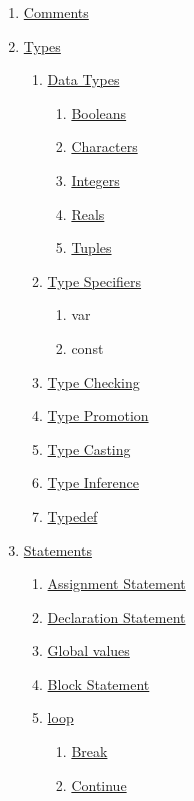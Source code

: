 \documentclass{article}
\begin{document}
	\begin{enumerate}[label*=\arabic*]
		\item \hyperref[sec:comments]{Comments}
		\item \hyperref[sec:types]{Types}
		\begin{enumerate}[label*=.\arabic*]
			\item \hyperref[sec:types]{Data Types}
			\begin{enumerate}[label*=.\arabic*]
				\item \hyperref[ssec:boolean]{Booleans}
				\item \hyperref[sec:character]{Characters}
				\item \hyperref[sec:integer]{Integers}
				\item \hyperref[sec:real]{Reals}
				\item \hyperref[sec:tuple]{Tuples}
			\end{enumerate}
			\item \hyperref[sec:typeSpecifiers]{Type Specifiers}
			\begin{enumerate}[label*=.\arabic*]
				\item var
				\item const
			\end{enumerate}
			\item \hyperref[sec:typeChecking]{Type Checking}
			\item \hyperref[sec:typePromotion]{Type Promotion}
			\item \hyperref[sec:typeCasting]{Type Casting}
			\item \hyperref[sec:typeInference]{Type Inference}
			\item \hyperref[sec:typedef]{Typedef}
		\end{enumerate}
		\item \hyperref[sec:statements]{Statements}
		\begin{enumerate}[label*=.\arabic*]
			\item \hyperref[sec:assignment]{Assignment Statement}
			\item \hyperref[sec:declaration]{Declaration Statement}
			\item \hyperref[sec:global]{Global values}
			\item \hyperref[sec:block]{Block Statement}
			\item \hyperref[sec:loop]{loop}
			\begin{enumerate}[label*=.\arabic*]
				\item \hyperref[sec:break]{Break}
				\item \hyperref[sec:continue]{Continue}

\end{enumerate}
\end{enumerate}
\end{enumerate}
\end{document}
